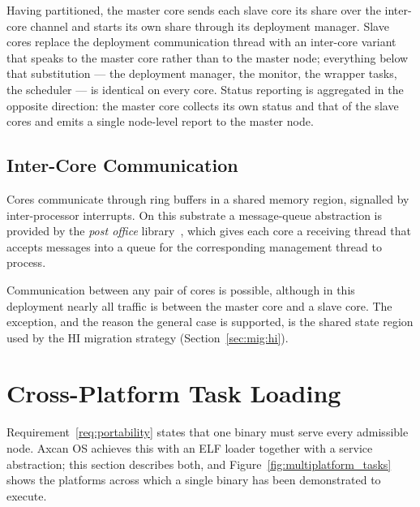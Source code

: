 Having partitioned, the master core sends each slave core its share over the
inter-core channel and starts its own share through its deployment manager.
Slave cores replace the deployment communication thread with an inter-core
variant that speaks to the master core rather than to the master node;
everything below that substitution --- the deployment manager, the monitor,
the wrapper tasks, the scheduler --- is identical on every core. Status
reporting is aggregated in the opposite direction: the master core collects
its own status and that of the slave cores and emits a single node-level
report to the master node.

\subsection{Inter-Core Communication}\label{subsec:os:intercore}

Cores communicate through ring buffers in a shared memory region, signalled by
inter-processor interrupts. On this substrate a message-queue abstraction is
provided by the \emph{post office}
library~\parencite{horst, wiesboeck}, which gives each core a
receiving thread that accepts messages into a queue for the corresponding
management thread to process.

Communication between any pair of cores is possible, although in this
deployment nearly all traffic is between the master core and a slave core.
The exception, and the reason the general case is supported, is the shared
state region used by the \textsf{HI} migration strategy
(Section~\ref{sec:mig:hi}).

\section{Cross-Platform Task Loading}\label{sec:os:loading}

Requirement~\ref{req:portability} states that one binary must serve every
admissible node. Axcan OS achieves this with an ELF loader together with a
service abstraction; this section describes both, and
Figure~\ref{fig:multiplatform_tasks} shows the platforms across which a single
binary has been demonstrated to execute.

